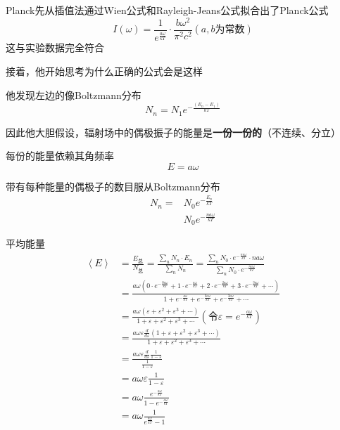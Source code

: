 \documentclass[lang=cn,10pt]{elegantbook}
\begin{document}
Planck先从插值法通过Wien公式和Rayleigh-Jeans公式拟合出了Planck公式
\begin{equation}
	I\left( \omega \right) =\frac{1}{e^{\frac{a\omega}{kT}}}\cdot \frac{b\omega ^2}{\pi ^2c^2}\left( a,b\text{为常数} \right) 
\end{equation}
这与实验数据完全符合

接着，他开始思考为什么正确的公式会是这样

他发现左边的像Boltzmann分布
\begin{equation}
	N_n=N_1e^{-\frac{\left( E_n-E_1 \right)}{kT}}
\end{equation}

因此他大胆假设，辐射场中的偶极振子的能量是\textbf{一份一份的}（不连续、分立）

每份的能量依赖其角频率
\begin{equation}
	E=a\omega
\end{equation}

带有每种能量的偶极子的数目服从Boltzmann分布
\begin{equation}
	\begin{split}
		N_n=&N_0e^{-\frac{E_n}{kT}}\\
		&N_0e^{-\frac{na\omega}{kT}}
	\end{split}
\end{equation}

平均能量\begin{equation}
	\begin{split}
		\left< E \right> &=\frac{E_{\text{总}}}{N_{\text{总}}}=\frac{\sum_n{N_n\cdot E_n}}{\sum_n{N_n}}=\frac{\sum_n{N_0\cdot e^{-\frac{na\omega}{kT}}\cdot na\omega}}{\sum_n{N_0\cdot e^{-\frac{na\omega}{kT}}}}
		\\
		&=\frac{a\omega \left( 0\cdot e^{-\frac{0a\omega}{kT}}+1\cdot e^{-\frac{a\omega}{kT}}+2\cdot e^{-\frac{2a\omega}{kT}}+3\cdot e^{-\frac{3a\omega}{kT}}+\cdots \right)}{1+e^{-\frac{a\omega}{kT}}+e^{-\frac{2a\omega}{kT}}+e^{-\frac{3a\omega}{kT}}+\cdots}
		\\
		&=\frac{a\omega \left( \varepsilon +\varepsilon ^2+\varepsilon ^3+\cdots \right)}{1+\varepsilon +\varepsilon ^2+\varepsilon ^3+\cdots}\left( \text{令}\varepsilon =e^{-\frac{a\omega}{kT}} \right) 
		\\
		&=\frac{a\omega \varepsilon \frac{d}{d\varepsilon}\left( 1+\varepsilon +\varepsilon ^2+\varepsilon ^3+\cdots \right)}{1+\varepsilon +\varepsilon ^2+\varepsilon ^3+\cdots}
		\\
		&=\frac{a\omega \varepsilon \frac{d}{d\varepsilon}\frac{1}{1-\varepsilon}}{\frac{1}{1-\varepsilon}}
		\\
		&=a\omega \varepsilon \frac{1}{1-\varepsilon}
		\\
		&=a\omega \frac{e^{-\frac{a\omega}{kT}}}{1-e^{-\frac{a\omega}{kT}}}
		\\
		&=a\omega \frac{1}{e^{\frac{a\omega}{kT}}-1}
		\\
	\end{split}
\end{equation}
\end{document}
